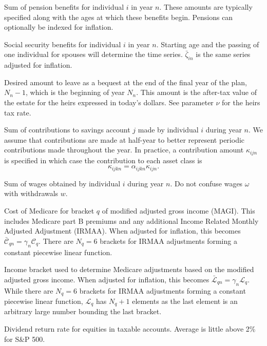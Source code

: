 \documentclass{report}[fleqn,11pt]
\begin{document}
\begin{description}[leftmargin=4em,style=multiline]
\item [$\pi_{in}$]
	Sum of pension benefits for individual $i$ in year $n$. These amounts are typically
	specified along with the ages at which these benefits begin.
	Pensions can optionally be indexed for inflation.
\item [$\zeta_{in}$]
	Social security benefits for individual $i$ in year $n$. Starting age and the passing
	of one individual for spouses will determine the time series. $\bar{\zeta}_{in}$ is
	the same series adjusted for inflation.
\item [$\epsilon_{N_n}$]
	Desired amount to leave as a bequest at the end of the final year of the plan, $N_n-1$,
	which is the beginning of year $N_n$. This amount is the after-tax value of the estate
	for the heirs expressed in today's dollars. See parameter $\nu$ for the heirs tax rate.
\item [$\kappa_{ijn}$]
	Sum of contributions to savings account $j$ made by individual $i$ during year $n$.
	We assume that contributions are made at half-year to better represent periodic
        contributions made throughout the year.
	In practice, a contribution
	amount $\kappa_{ijn}$ is specified in which case the contribution to each asset
	class is
	\begin{equation}
		\kappa_{ijkn} = \alpha_{ijkn}\kappa_{ijn}.
	\end{equation}
\item [$\omega_{in}$]
	Sum of wages obtained by individual $i$ during year $n$.
	Do not confuse wages $\omega$ with withdrawals $w$.
\item [$\mathcal{C}_{q}$]
	Cost of Medicare for bracket $q$ of modified adjusted gross income (MAGI). This includes
	Medicare part B premiums and any additional
	Income Related Monthly Adjusted Adjustment (IRMAA). When adjusted
	for inflation, this becomes $\bar{\mathcal{C}}_{qn} = \gamma_n\mathcal{C}_q$.
        There are $N_q=6$ brackets for IRMAA adjustments forming a constant piecewise linear function.
\item [$\mathcal{L}_{q}$]
	Income bracket used to determine Medicare adjustments based on the modified adjusted gross income.
	When adjusted for inflation, this becomes $\bar{\mathcal{L}}_{qn} = \gamma_n\mathcal{L}_q$.
        While there are $N_q=6$ brackets for IRMAA adjustments forming a constant piecewise linear function,
	$\mathcal{L}_q$ has $N_q + 1$ elements as the last element is an arbitrary large number bounding the
	last bracket.
\item [$\mu$]
	Dividend return rate for equities in taxable accounts. Average is little above 2\% for S\&P 500.

\end{description}
\end{document}
